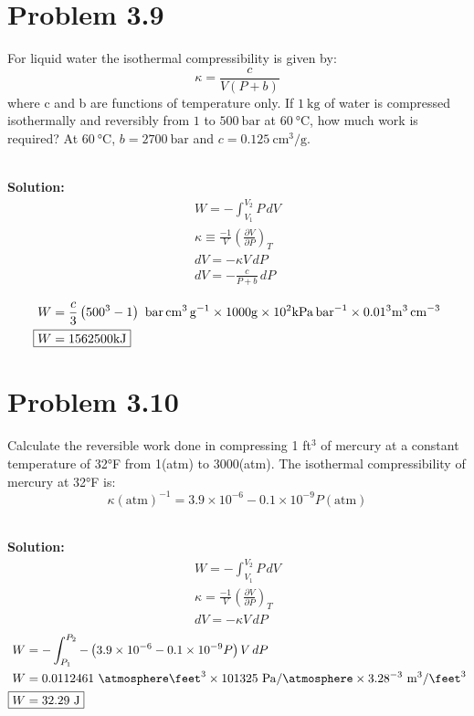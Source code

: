 \documentclass{article}
\newenvironment{solution}{\par\noindent\textbf{\\Solution:\\}}{\par\medskip}
\begin{document}
\section*{Problem 3.9}
For liquid water the isothermal compressibility is given by:
$$ \kappa = \frac{c}{V(P+b)} $$
where c and b are functions of temperature only. If $1~\unit{
\kilo\gram }$ of water is compressed isothermally and reversibly from
$1$ to $500~\unit{ \bar }$ at $60~\unit{ \degreeCelsius }$, how much
work is required? At $60~\unit{ \degreeCelsius }$, $b=2700~\unit{
\bar }$ and $c=0.125~\unit{ \centi\meter\cubed\per\gram }$.

\begin{solution}
  \begin{gather*}
    W = -\int_{V_{1}}^{V_{2}} P \, dV \\
    \kappa \equiv \frac{-1}{V}\left( \frac{\partial V}{\partial P}
    \right)_{T} \\
    dV = -\kappa V \, dP \\
    dV = -\frac{c}{P+b}\,dP \\
  \end{gather*}
  \vspace{-3em}
  \begin{align*}
    W & = \frac{c}{3}\left( 500^{3}-1 \right)~\unit{
    \bar\centi\meter\cubed\per\gram }\times 1000\unit{ \gram } \times
    10^{2}\unit{ \kilo\pascal\per\bar }\times 0.01^{3}\unit{
    \meter\cubed\per\centi\meter\cubed } \\
    \Aboxed{ W & = 1562500\unit{ \kilo\joule } }
  \end{align*}
\end{solution}

\section*{Problem 3.10}
Calculate the reversible work done in compressing 1 ft$^3$ of mercury
at a constant temperature of 32°F from 1(atm) to 3000(atm). The
isothermal compressibility of mercury at 32°F is:
$$ \kappa(\text{atm})^{-1} = 3.9 \times 10^{-6} - 0.1 \times 10^{-9}
P(\text{atm}) $$

\begin{solution}
  \begin{gather*}
    W = -\int_{V_{1}}^{V_{2}} P \, dV \\
    \kappa = \frac{-1}{V}\left( \frac{\partial V}{\partial P} \right)_{T} \\
    dV = -\kappa V\,dP
  \end{gather*}
  \begin{align*}
    W &= -\int_{P_{1}}^{P_{2}} -\left(
    3.9\times10^{-6}-0.1\times10^{-9}P \right)V \, dP \\
    W &= 0.0112461~\unit{ \atmosphere\feet\cubed } \times
    101325~\unit{ \pascal\per\atmosphere }\times 3.28^{-3}~\unit{
    \meter\cubed\per\feet\cubed } \\
    \Aboxed{ W &= 32.29~\unit{ \joule } }
  \end{align*}
\end{solution}
\end{document}
